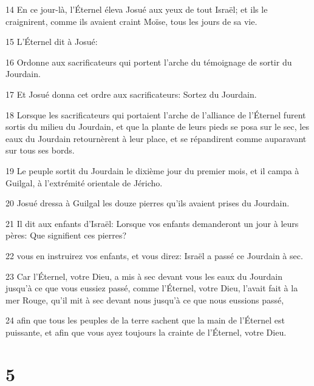 \par 14 En ce jour-là, l'Éternel éleva Josué aux yeux de tout Israël; et ils le craignirent, comme ils avaient craint Moïse, tous les jours de sa vie.
\par 15 L'Éternel dit à Josué:
\par 16 Ordonne aux sacrificateurs qui portent l'arche du témoignage de sortir du Jourdain.
\par 17 Et Josué donna cet ordre aux sacrificateurs: Sortez du Jourdain.
\par 18 Lorsque les sacrificateurs qui portaient l'arche de l'alliance de l'Éternel furent sortis du milieu du Jourdain, et que la plante de leurs pieds se posa sur le sec, les eaux du Jourdain retournèrent à leur place, et se répandirent comme auparavant sur tous ses bords.
\par 19 Le peuple sortit du Jourdain le dixième jour du premier mois, et il campa à Guilgal, à l'extrémité orientale de Jéricho.
\par 20 Josué dressa à Guilgal les douze pierres qu'ils avaient prises du Jourdain.
\par 21 Il dit aux enfants d'Israël: Lorsque vos enfants demanderont un jour à leurs pères: Que signifient ces pierres?
\par 22 vous en instruirez vos enfants, et vous direz: Israël a passé ce Jourdain à sec.
\par 23 Car l'Éternel, votre Dieu, a mis à sec devant vous les eaux du Jourdain jusqu'à ce que vous eussiez passé, comme l'Éternel, votre Dieu, l'avait fait à la mer Rouge, qu'il mit à sec devant nous jusqu'à ce que nous eussions passé,
\par 24 afin que tous les peuples de la terre sachent que la main de l'Éternel est puissante, et afin que vous ayez toujours la crainte de l'Éternel, votre Dieu.

\chapter{5}

